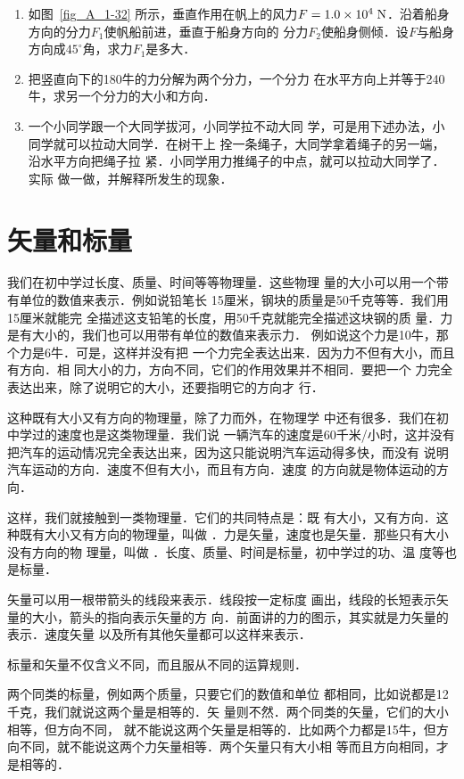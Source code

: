 \begin{enumerate}
\item 如图~\ref{fig_A_1-32} 所示，垂直作用在帆上的风力$F=1.0\times 10^4 \;\text{N} $．沿着船身方向的分力$F_1$使帆船前进，垂直于船身方向的
分力$F_2$使船身侧倾．设$F$与船身方向成$45^\circ$角，求力$F_1$是多大．


\item 把竖直向下的180牛的力分解为两个分力，一个分力
在水平方向上并等于240牛，求另一个分力的大小和方向．

\item 一个小同学跟一个大同学拔河，小同学拉不动大同
学，可是用下述办法，小同学就可以拉动大同学．在树干上
拴一条绳子，大同学拿着绳子的另一端，沿水平方向把绳子拉
紧．小同学用力推绳子的中点，就可以拉动大同学了．实际
做一做，并解释所发生的现象．

\end{enumerate} 

\section{矢量和标量} 
    我们在初中学过长度、质量、时间等等物理量．这些物理
量的大小可以用一个带有单位的数值来表示．例如说铅笔长
15厘米，钢块的质量是50千克等等．我们用15厘米就能完
全描述这支铅笔的长度，用50千克就能完全描述这块钢的质
量．力是有大小的，我们也可以用带有单位的数值来表示力．
例如说这个力是10牛，那个力是6牛．可是，这样并没有把
一个力完全表达出来．因为力不但有大小，而且有方向．相
同大小的力，方向不同，它们的作用效果并不相同．要把一个
力完全表达出来，除了说明它的大小，还要指明它的方向才
行．

    这种既有大小又有方向的物理量，除了力而外，在物理学
中还有很多．我们在初中学过的速度也是这类物理量．我们说
一辆汽车的速度是60千米/小时，这并没有把汽车的运动情况完全表达出来，因为这只能说明汽车运动得多快，而没有
说明汽车运动的方向．速度不但有大小，而且有方向．速度
的方向就是物体运动的方向．

    这样，我们就接触到一类物理量．它们的共同特点是：既
有大小，又有方向．这种既有大小又有方向的物理量，叫做 ．力是矢量，速度也是矢量．那些只有大小没有方向的物
理量，叫做 ．长度、质量、时间是标量，初中学过的功、温
度等也是标量．

    矢量可以用一根带箭头的线段来表示．线段按一定标度
画出，线段的长短表示矢量的大小，箭头的指向表示矢量的方
向．前面讲的力的图示，其实就是力矢量的表示．速度矢量
以及所有其他矢量都可以这样来表示．

    标量和矢量不仅含义不同，而且服从不同的运算规则．

    两个同类的标量，例如两个质量，只要它们的数值和单位
都相同，比如说都是12千克，我们就说这两个量是相等的．矢
量则不然．两个同类的矢量，它们的大小相等，但方向不同，
就不能说这两个矢量是相等的．比如两个力都是15牛，但方
向不同，就不能说这两个力矢量相等．两个矢量只有大小相
等而且方向相同，才是相等的．

